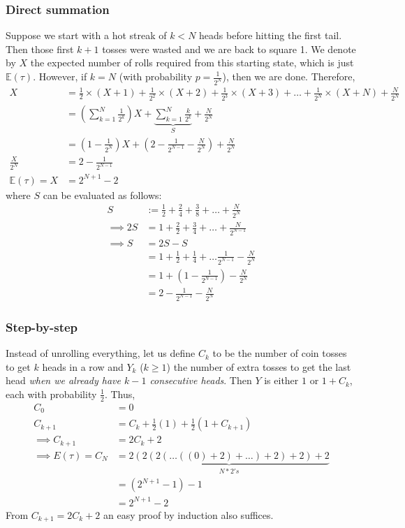 \documentclass[11pt]{article}
\newcommand{\E}{\mathbb{E}}
\begin{document}
\subsubsection{Direct summation}
Suppose we start with a hot streak of $k < N$ heads before hitting the first tail. Then those first $k+1$ tosses were wasted and we are back to square 1. We denote by $X$ the expected number of rolls required from this starting state, which is just $\E(\tau)$. However, if $k=N$ (with probability $p=\frac{1}{2^N}$), then we are done. Therefore,
\begin{align*}
X &= \frac{1}{2} \times (X+1) + \frac{1}{2^2} \times (X+2) + \frac{1}{2^3} \times (X+3) + \dots + \frac{1}{2^N} \times (X+N) + \frac{N}{2^N}\\
&= \left(\sum_{k=1}^{N}\frac{1}{2^k}\right)X + \underbrace{\sum_{k=1}^{N}\frac{k}{2^k}}_{S} + \frac{N}{2^N} \\
&= (1-\frac{1}{2^N})X + \left(2 - \frac{1}{2^{N-1}} - \frac{N}{2^N}\right) + \frac{N}{2^N} \\
\frac{X}{2^N} &= 2 - \frac{1}{2^{N-1}} \\
\E(\tau) = X &= \boxed{2^{N+1} - 2}
\end{align*}
where $S$ can be evaluated as follows:
\begin{align*}
S&:= \frac{1}{2} + \frac{2}{4} + \frac{3}{8} + \dots + \frac{N}{2^N} \\
\implies 2S &= 1 + \frac{2}{2} + \frac{3}{4} + \dots + \frac{N}{2^{N-1}} \\
\implies S &= 2S - S \\
&=1 + \frac{1}{2} + \frac{1}{4} + \dots \frac{1}{2^{N-1}} - \frac{N}{2^N} \\
&=1 + (1-\frac{1}{2^{N-1}}) - \frac{N}{2^N} \\
&= 2 - \frac{1}{2^{N-1}} - \frac{N}{2^N}
\end{align*}

\subsubsection{Step-by-step}
Instead of unrolling everything, let us define $C_k$ to be the number of coin tosses to get $k$ heads in a row and $Y_k$ ($k \geq 1$) the number of extra tosses to get the last head \emph{when we already have $k-1$ consecutive heads}. Then $Y$ is either $1$ or $1 + C_k$, each with probability $\frac{1}{2}$. Thus, 
\begin{align*}
C_0 &= 0 \\
C_{k+1} &= C_k + \frac{1}{2}(1) + \frac{1}{2}(1+C_{k+1}) \\
\implies C_{k+1} &= 2C_k + 2 \\
\implies E(\tau) = C_N &= \underbrace{2(2(2(\dots ((0) + 2) + \dots )+ 2)+2)+2}_{N * 2's} \\
&= (2^{N+1} - 1) - 1 \\
&= \boxed{2^{N+1} - 2}
\end{align*}
From $C_{k+1} = 2C_k+2$ an easy proof by induction also suffices.
\end{document}
